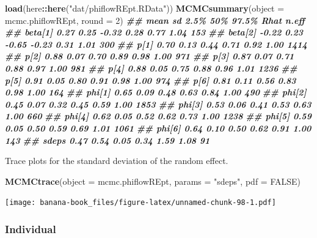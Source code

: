 \documentclass[
  12pt,
]{krantz}
\newenvironment{Shaded}{\begin{snugshade}}{\end{snugshade}}
\newcommand{\AttributeTok}[1]{\textcolor[rgb]{0.13,0.29,0.53}{#1}}
\newcommand{\ConstantTok}[1]{\textcolor[rgb]{0.56,0.35,0.01}{#1}}
\newcommand{\DecValTok}[1]{\textcolor[rgb]{0.00,0.00,0.81}{#1}}
\newcommand{\DocumentationTok}[1]{\textcolor[rgb]{0.56,0.35,0.01}{\textbf{\textit{#1}}}}
\newcommand{\FunctionTok}[1]{\textcolor[rgb]{0.13,0.29,0.53}{\textbf{#1}}}
\newcommand{\NormalTok}[1]{#1}
\newcommand{\SpecialCharTok}[1]{\textcolor[rgb]{0.81,0.36,0.00}{\textbf{#1}}}
\newcommand{\StringTok}[1]{\textcolor[rgb]{0.31,0.60,0.02}{#1}}
\begin{document}
\begin{Shaded}
\begin{Highlighting}[]
\FunctionTok{load}\NormalTok{(here}\SpecialCharTok{::}\FunctionTok{here}\NormalTok{(}\StringTok{"dat/phiflowREpt.RData"}\NormalTok{))}
\FunctionTok{MCMCsummary}\NormalTok{(}\AttributeTok{object =}\NormalTok{ mcmc.phiflowREpt, }\AttributeTok{round =} \DecValTok{2}\NormalTok{)}
\DocumentationTok{\#\#          mean   sd  2.5\%   50\% 97.5\% Rhat n.eff}
\DocumentationTok{\#\# beta[1]  0.27 0.25 {-}0.32  0.28  0.77 1.04   153}
\DocumentationTok{\#\# beta[2] {-}0.22 0.23 {-}0.65 {-}0.23  0.31 1.01   300}
\DocumentationTok{\#\# p[1]     0.70 0.13  0.44  0.71  0.92 1.00  1414}
\DocumentationTok{\#\# p[2]     0.88 0.07  0.70  0.89  0.98 1.00   971}
\DocumentationTok{\#\# p[3]     0.87 0.07  0.71  0.88  0.97 1.00   981}
\DocumentationTok{\#\# p[4]     0.88 0.05  0.75  0.88  0.96 1.01  1236}
\DocumentationTok{\#\# p[5]     0.91 0.05  0.80  0.91  0.98 1.00   974}
\DocumentationTok{\#\# p[6]     0.81 0.11  0.56  0.83  0.98 1.00   164}
\DocumentationTok{\#\# phi[1]   0.65 0.09  0.48  0.63  0.84 1.00   490}
\DocumentationTok{\#\# phi[2]   0.45 0.07  0.32  0.45  0.59 1.00  1853}
\DocumentationTok{\#\# phi[3]   0.53 0.06  0.41  0.53  0.63 1.00   660}
\DocumentationTok{\#\# phi[4]   0.62 0.05  0.52  0.62  0.73 1.00  1238}
\DocumentationTok{\#\# phi[5]   0.59 0.05  0.50  0.59  0.69 1.01  1061}
\DocumentationTok{\#\# phi[6]   0.64 0.10  0.50  0.62  0.91 1.00   143}
\DocumentationTok{\#\# sdeps    0.47 0.54  0.05  0.34  1.59 1.08    91}
\end{Highlighting}
\end{Shaded}

Trace plots for the standard deviation of the random effect.

\begin{Shaded}
\begin{Highlighting}[]
\FunctionTok{MCMCtrace}\NormalTok{(}\AttributeTok{object =}\NormalTok{ mcmc.phiflowREpt, }\AttributeTok{params =} \StringTok{"sdeps"}\NormalTok{, }\AttributeTok{pdf =} \ConstantTok{FALSE}\NormalTok{)}
\end{Highlighting}
\end{Shaded}

\texttt{[image: banana-book\_files/figure-latex/unnamed-chunk-98-1.pdf]}

\hypertarget{individual}{%
\subsubsection{Individual}\label{individual}}
\end{document}
